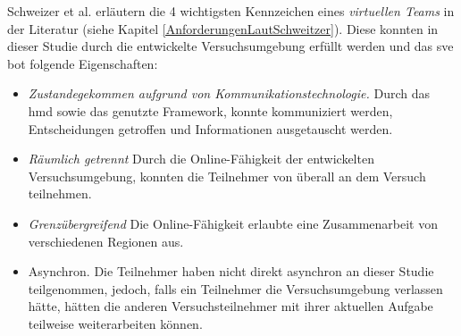 \documentclass[a4paper,11pt]{article}%
\renewcommand{\\}{\vspace*{0.5\baselineskip} \newline}
\begin{document}
{{Schweizer et al. \citep[S. 270]{schweitzer2010conceptualizing} erläutern die 4 wichtigsten Kennzeichen eines \textit{virtuellen Teams} in der Literatur (siehe Kapitel \ref{AnforderungenLautSchweitzer}). Diese konnten in dieser Studie durch die entwickelte Versuchsumgebung erfüllt werden und das \ac{sve} bot folgende Eigenschaften:
\begin{itemize}
\item \textit{Zustandegekommen aufgrund von Kommunikationstechnologie.} Durch das \ac{hmd} sowie das genutzte Framework, konnte kommuniziert werden, Entscheidungen getroffen und Informationen ausgetauscht werden.
\item \textit{Räumlich getrennt} Durch die Online-Fähigkeit der entwickelten Versuchsumgebung, konnten die Teilnehmer von überall an dem Versuch teilnehmen.
\item \textit{Grenzübergreifend} Die Online-Fähigkeit erlaubte eine Zusammenarbeit von verschiedenen Regionen aus.
\item Asynchron. Die Teilnehmer haben nicht direkt asynchron an dieser Studie teilgenommen, jedoch, falls ein Teilnehmer die Versuchsumgebung verlassen hätte, hätten die anderen Versuchsteilnehmer mit ihrer aktuellen Aufgabe teilweise weiterarbeiten können.
\end{itemize}

}}
\end{document}
